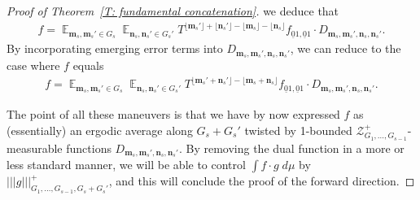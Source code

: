 \documentclass[11pt]{amsart}
\theoremstyle{definition}
\DeclareMathOperator*{\E}{\mathbb{E}}
\newcommand{\CZ}{{\mathcal Z}}
\newcommand{\bm}{{\mathbf{m}}}
\newcommand{\bn}{{\mathbf{n}}}
\newcommand{\nnorm}[1]{\lvert\!|\!| #1|\!|\!\rvert}
\newcommand{\1}{{\mathbf{1}}}
\newcommand{\sfloor}[1]{{\lfloor #1 \rfloor}}
\begin{document}
\begin{proof}[Proof of Theorem~\ref{T: fundamental concatenation}]
we deduce that
\begin{align*}
    f = \E_{\bm_s,\bm_s'\in G_s} \E_{\bn_s,\bn_s'\in G_s'} T^{\sfloor{\bm_s'} +\sfloor{\bn_s'}- \sfloor{\bm_s}-\sfloor{\bn_s}}f_{\underline{0}1, \underline{0}1} \cdot D_{\bm_s,\bm_s', \bn_s,\bn_s'}.
\end{align*}
By incorporating emerging error terms into $D_{\bm_s,\bm_s', \bn_s,\bn_s'}$, we can reduce to the case where $f$ equals
\begin{align*}
    f = \E_{\bm_s,\bm_s'\in G_s} \E_{\bn_s,\bn_s'\in G_s'} %
    T^{\sfloor{\bm_s'+\bn_s'}- \sfloor{\bm_s+\bn_s}}f_{\underline{0}1, \underline{0}1} \cdot D_{\bm_s,\bm_s', \bn_s,\bn_s'}.   
\end{align*}

The point of all these maneuvers is that we have by now expressed $f$ as (essentially) an ergodic average along $G_s + G_s'$ twisted by %
1-bounded $\CZ^+_{G_1, \ldots, G_{s-1}}$-measurable functions $D_{\bm_s,\bm_s', \bn_s,\bn_s'}$. By removing the dual function in a more or less standard manner, we will be able to control $\int f\cdot g\; d\mu$ by $\nnorm{g}^+_{G_1,\dots, G_{s-1}, G_s+G_s'}$, and this will conclude the proof of the forward direction.


\end{proof}
\end{document}
